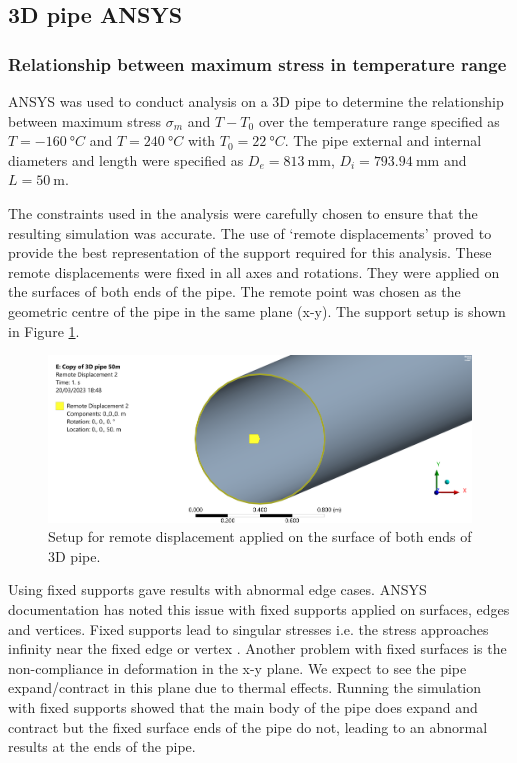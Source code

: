 \subsection{3D pipe ANSYS}\label{part1c}
\subsubsection{Relationship between maximum stress in temperature range}
ANSYS was used to conduct analysis on a 3D pipe to determine the relationship between maximum stress $\sigma_m$ and $T-T_0$ over the temperature range specified as $T = \SI{-160}{\degree C}$ and $T = \SI{240}{\degree C}$ with $T_0 = \SI{22}{\degree C}$. The pipe external and internal diameters and length were specified as $D_e = \SI{813}{\milli\meter}$, $D_i = \SI{793.94}{\milli\meter}$ and $L = \SI{50}{\meter}$.

The constraints used in the analysis were carefully chosen to ensure that the resulting simulation was accurate. The use of `remote displacements' proved to provide the best representation of the support required for this analysis. These remote displacements were fixed in all axes and rotations. They were applied on the surfaces of both ends of the pipe. The remote point was chosen as the geometric centre of the pipe in the same plane (x-y). The support setup is shown in Figure \ref{supports}.
\begin{figure}[H]
    \centering
    \includegraphics[width = \textwidth]{img/part1c-support.png}
    \caption{Setup for remote displacement applied on the surface of both ends of 3D pipe.}
    \label{supports}
\end{figure}
Using fixed supports gave results with abnormal edge cases. ANSYS documentation has noted this issue with fixed supports applied on surfaces, edges and vertices. Fixed supports lead to singular stresses i.e. the stress approaches infinity near the fixed edge or vertex \cite{ansysDocumentation}. Another problem with fixed surfaces is the non-compliance in deformation in the x-y plane. We expect to see the pipe expand/contract in this plane due to thermal effects. Running the simulation with fixed supports showed that the main body of the pipe does expand and contract but the fixed surface ends of the pipe do not, leading to an abnormal results at the ends of the pipe.

